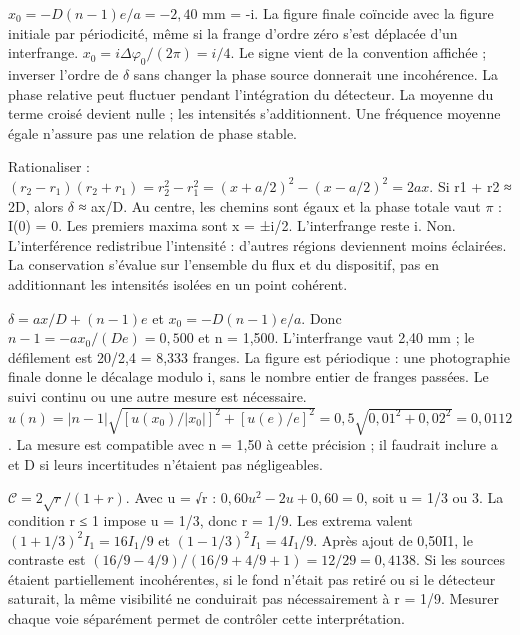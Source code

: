 $x_0=-D(n-1)e/a=-2{,}40$ mm = -i. La figure finale coïncide avec la figure initiale par périodicité, même si la frange d’ordre zéro s’est déplacée d’un interfrange.
$x_0=i\Delta\varphi_0/(2\pi)=i/4$. Le signe vient de la convention affichée ; inverser l’ordre de \ensuremath{\delta} sans changer la phase source donnerait une incohérence.
La phase relative peut fluctuer pendant l’intégration du détecteur. La moyenne du terme croisé devient nulle ; les intensités s’additionnent. Une fréquence moyenne égale n’assure pas une relation de phase stable.


Rationaliser : $(r_2-r_1)(r_2+r_1)=r_2^2-r_1^2=(x+a/2)^2-(x-a/2)^2=2ax$. Si r1 + r2 ≈ 2D, alors \ensuremath{\delta} ≈ ax/D.
Au centre, les chemins sont égaux et la phase totale vaut \ensuremath{\pi} : I(0) = 0. Les premiers maxima sont x = ±i/2. L’interfrange reste i.
Non. L’interférence redistribue l’intensité : d’autres régions deviennent moins éclairées. La conservation s’évalue sur l’ensemble du flux et du dispositif, pas en additionnant les intensités isolées en un point cohérent.


$\delta=ax/D+(n-1)e$ et $x_0=-D(n-1)e/a$. Donc $n-1=-ax_0/(De)=0{,}500$ et n = 1,500. L’interfrange vaut 2,40 mm ; le défilement est 20/2,4 = 8,333 franges. La figure est périodique : une photographie finale donne le décalage modulo i, sans le nombre entier de franges passées. Le suivi continu ou une autre mesure est nécessaire. $u(n)=|n-1|\sqrt{[u(x_0)/|x_0|]^2+[u(e)/e]^2}=0{,}5\sqrt{0{,}01^2+0{,}02^2}=0{,}0112$. La mesure est compatible avec n = 1,50 à cette précision ; il faudrait inclure a et D si leurs incertitudes n’étaient pas négligeables.

$\mathcal C=2\sqrt r/(1+r)$. Avec u = √r : $0{,}60u^2-2u+0{,}60=0$, soit u = 1/3 ou 3. La condition r ≤ 1 impose u = 1/3, donc r = 1/9. Les extrema valent $(1+1/3)^2I_1=16I_1/9$ et $(1-1/3)^2I_1=4I_1/9$. Après ajout de 0,50I1, le contraste est $(16/9-4/9)/(16/9+4/9+1)=12/29=0{,}4138$. Si les sources étaient partiellement incohérentes, si le fond n’était pas retiré ou si le détecteur saturait, la même visibilité ne conduirait pas nécessairement à r = 1/9. Mesurer chaque voie séparément permet de contrôler cette interprétation.


